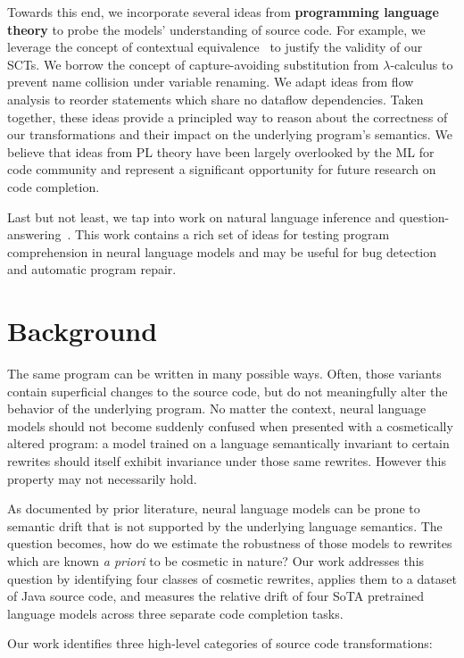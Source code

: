 \documentclass[usenames,dvipsnames]{article} %
\begin{document}
  Towards this end, we incorporate several ideas from \textbf{programming language theory} to probe the models' understanding of source code. For example, we leverage the concept of contextual equivalence~\citep{morris1969lambda} to justify the validity of our SCTs. We borrow the concept of capture-avoiding substitution from $\lambda$-calculus to prevent name collision under variable renaming. We adapt ideas from flow analysis to reorder statements which share no dataflow dependencies. Taken together, these ideas provide a principled way to reason about the correctness of our transformations and their impact on the underlying program's semantics. We believe that ideas from PL theory have been largely overlooked by the ML for code community and represent a significant opportunity for future research on code completion.

  Last but not least, we tap into work on natural language inference and question-answering~\citep{liu2021codeqa}. This work contains a rich set of ideas for testing program comprehension in neural language models and may be useful for bug detection and automatic program repair.

  \pagebreak\section{Background}\label{sec:background}

  The same program can be written in many possible ways. Often, those variants contain superficial changes to the source code, but do not meaningfully alter the behavior of the underlying program. No matter the context, neural language models should not become suddenly confused when presented with a cosmetically altered program: a model trained on a language semantically invariant to certain rewrites should itself exhibit invariance under those same rewrites. However this property may not necessarily hold.

  As documented by prior literature, neural language models can be prone to semantic drift that is not supported by the underlying language semantics. The question becomes, how do we estimate the robustness of those models to rewrites which are known \textit{a priori} to be cosmetic in nature? Our work addresses this question by identifying four classes of cosmetic rewrites, applies them to a dataset of Java source code, and measures the relative drift of four SoTA pretrained language models across three separate code completion tasks.

Our work identifies three high-level categories of source code transformations:
\end{document}
